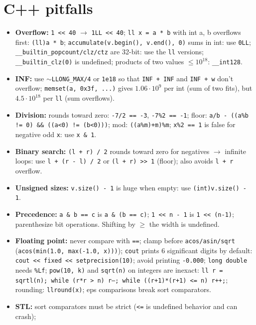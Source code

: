\section{C++ pitfalls}
\begin{itemize}
	\item \textbf{Overflow:} \texttt{1 <{}< 40} $\to$ \texttt{1LL <{}< 40}; \texttt{ll x = a * b} with int a, b
		overflows first: \texttt{(ll)a * b}; \texttt{accumulate(v.begin(), v.end(), 0)} sums in int: use \texttt{0LL};
		\texttt{\_\_builtin\_popcount/clz/ctz} are 32-bit: use the \texttt{ll} versions;
		\texttt{\_\_builtin\_clz(0)} is undefined; products of two values $\le 10^{18}$: \texttt{\_\_int128}.
	\item \textbf{INF:} use $\sim$\texttt{LLONG\_MAX/4} or \texttt{1e18} so that \texttt{INF + INF} and \texttt{INF + w}
		don't overflow; \texttt{memset(a, 0x3f, ...)} gives $1.06\cdot10^9$ per int (sum of two fits), but
		$4.5\cdot 10^{18}$ per \texttt{ll} (sum overflows).
	\item \textbf{Division:} rounds toward zero: \texttt{-7/2 == -3}, \texttt{-7\%2 == -1}; floor:
		\texttt{a/b - ((a\%b != 0) \&\& ((a<0) != (b<0)))}; mod: \texttt{((a\%m)+m)\%m};
		\texttt{x\%2 == 1} is false for negative odd \texttt{x}: use \texttt{x \& 1}.
	\item \textbf{Binary search:} \texttt{(l + r) / 2} rounds toward zero for negatives $\to$ infinite loops:
		use \texttt{l + (r - l) / 2} or \texttt{(l + r) >{}> 1} (floor); also avoids \texttt{l + r} overflow.
	\item \textbf{Unsigned sizes:} \texttt{v.size() - 1} is huge when empty: use \texttt{(int)v.size() - 1}.
	\item \textbf{Precedence:} \texttt{a \& b == c} is \texttt{a \& (b == c)}; \texttt{1 <{}< n - 1} is \texttt{1 <{}< (n-1)};
		parenthesize bit operations. Shifting by $\ge$ the width is undefined.
	\item \textbf{Floating point:} never compare with \texttt{==}; clamp before \texttt{acos/asin/sqrt}
		(\texttt{acos(min(1.0, max(-1.0, x)))}); \texttt{cout} prints 6 significant digits by default:
		\texttt{cout <{}< fixed <{}< setprecision(10)}; avoid printing \texttt{-0.000}; \texttt{long double}
		needs \texttt{\%Lf}; \texttt{pow(10, k)} and \texttt{sqrt(n)} on integers are inexact:
		\texttt{ll r = sqrtl(n); while (r*r > n) r--; while ((r+1)*(r+1) <= n) r++;};
		rounding: \texttt{llround(x)}; eps comparisons break sort comparators.
	\item \textbf{STL:} sort comparators must be strict (\texttt{<=} is undefined behavior and can crash);

\end{itemize}
